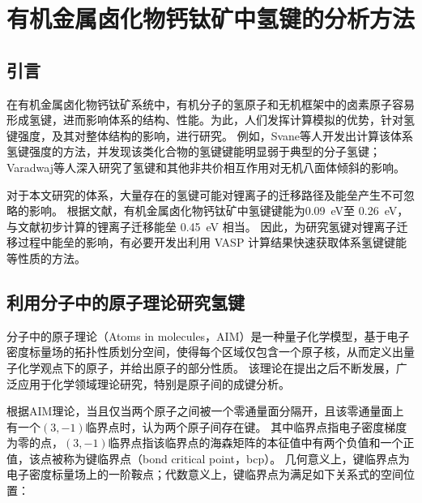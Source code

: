 \chapter{有机金属卤化物钙钛矿中氢键的分析方法}

\section{引言}

在有机金属卤化物钙钛矿系统中，有机分子的氢原子和无机框架中的卤素原子容易形成氢键，进而影响体系的结构、性能。为此，人们发挥计算模拟的优势，针对氢键强度，及其对整体结构的影响，进行研究。
例如，Svane等人开发出计算该体系氢键强度的方法，并发现该类化合物的氢键键能明显弱于典型的分子氢键；
Varadwaj等人深入研究了氢键和其他非共价相互作用对无机八面体倾斜的影响。

对于本文研究的体系，大量存在的氢键可能对锂离子的迁移路径及能垒产生不可忽略的影响。
根据文献\cite{svaneHowStrongHydrogen2017}，有机金属卤化物钙钛矿中氢键键能为\SI{0.09}{eV}至 \SI{0.26}{eV}，与文献\cite{yinMetalChloridePerovskite2020}初步计算的锂离子迁移能垒 \SI{0.45}{eV} 相当。
因此，为研究氢键对锂离子迁移过程中能垒的影响，有必要开发出利用 VASP 计算结果快速获取体系氢键键能等性质的方法。

\section{利用分子中的原子理论研究氢键}

分子中的原子理论（Atoms in molecules，AIM）是一种量子化学模型，基于电子密度标量场的拓扑性质划分空间，使得每个区域仅包含一个原子核，从而定义出量子化学观点下的原子，并给出原子的部分性质。
该理论在提出之后不断发展，广泛应用于化学领域理论研究，特别是原子间的成键分析。

根据AIM理论，当且仅当两个原子之间被一个零通量面分隔开，且该零通量面上有一个$(3,-1)$临界点时，认为两个原子间存在键。
其中临界点指电子密度梯度为零的点，$(3,-1)$临界点指该临界点的海森矩阵的本征值中有两个负值和一个正值，该点被称为键临界点（bond critical point，bcp）。
几何意义上，键临界点为电子密度标量场上的一阶鞍点；代数意义上，键临界点为满足如下关系式的空间位置：


